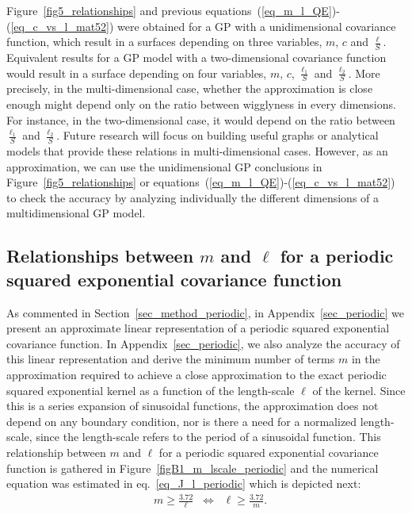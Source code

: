 {\color{blue}
}

Figure~\ref{fig5_relationships} and previous equations~(\ref{eq_m_l_QE})-(\ref{eq_c_vs_l_mat52}) were obtained for a GP with a unidimensional covariance function, which result in a surfaces depending on three variables, $m$, $c$ and $\frac{\ell}{S}$. Equivalent results for a GP model with a two-dimensional covariance function would result in a surface depending on four variables, $m$, $c$, $\frac{\ell_1}{S}$ and $\frac{\ell_2}{S}$. More precisely, in the multi-dimensional case, whether the approximation is close enough might depend only on the ratio between wigglyness in every dimensions. For instance, in the two-dimensional case, it would depend on the ratio between $\frac{\ell_1}{S}$ and $\frac{\ell_2}{S}$. Future research will focus on building useful graphs or analytical models that provide these relations in multi-dimensional cases. However, as an approximation, we can use the unidimensional GP conclusions in Figure~\ref{fig5_relationships} or equations~(\ref{eq_m_l_QE})-(\ref{eq_c_vs_l_mat52}) to check the accuracy by analyzing individually the different dimensions of a multidimensional GP model.

\subsection{Relationships between $m$ and $\ell$ for a periodic squared exponential covariance function} \label{subsec_empiric_relations_periodic}

As commented in Section~\ref{sec_method_periodic}, in Appendix~\ref{sec_periodic} we present an approximate linear representation of a periodic squared exponential covariance function. In Appendix~\ref{sec_periodic}, we also analyze the accuracy of this linear representation and derive the minimum number of terms $m$ in the approximation required to achieve a close approximation to the exact periodic squared exponential kernel as a function of the length-scale $\ell$ of the kernel. Since this is a series expansion of sinusoidal functions, the approximation does not depend on any boundary condition, nor is there a need for a normalized length-scale, since the length-scale refers to the period of a sinusoidal function. This relationship between $m$ and $\ell$ for a periodic squared exponential covariance function is gathered in Figure~\ref{figB1_m_lscale_periodic} and the numerical equation was estimated in eq.~\eqref{eq_J_l_periodic} which is depicted next:
%
\begin{align*}
&m \geq \frac{3.72}{\ell} \;\; \Leftrightarrow \;\; \ell \geq \frac{3.72}{m} .
\end{align*}

